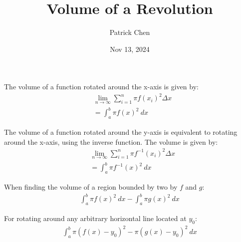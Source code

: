 \documentclass{article}
\title{Volume of a Revolution}
\author{Patrick Chen}
\date{Nov 13, 2024}
\theoremstyle{mytheoremstyle}
\theoremstyle{mytheoremstyle}
\theoremstyle{myproblemstyle}
\begin{document}
    \maketitle
    The volume of a function rotated around the x-axis is given by:
    \begin{align*}
        &\lim_{n\to \infty} \sum_{i=1}^{n} \pi f(x_i)^2\Delta x \\
        &=\int_{a}^{b} \pi f(x)^2 \ dx
    \end{align*}

    The volume of a function rotated around the y-axis is equivalent to rotating
    around the x-axis, using the inverse function. The volume is given by:
    \begin{align*}
        &\lim_{n\to \infty} \sum_{i=1}^{n} \pi f^{-1}(x_i)^2\Delta x \\
        &=\int_{a}^{b} \pi f^{-1}(x)^2 \ dx
    \end{align*}

    When finding the volume of a region bounded by two by $f$ and $g$:
    \begin{align*}
        \int_{a}^{b} \pi f(x)^2 \ dx - \int_{a}^{b} \pi g(x)^2 \ dx
    \end{align*}

    For rotating around any arbitrary horizontal line located at $y_0$:
    \begin{align*}
        \int_{a}^{b} \pi (f(x)-y_0)^2 - \pi (g(x)-y_0)^2 \ dx
    \end{align*}
\end{document}
